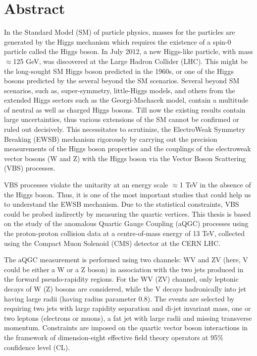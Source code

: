 \chapter*{Abstract}  
In the Standard Model (SM) of particle physics, masses for the particles are generated by the Higgs mechanism which requires the existence of a spin-0 particle called the Higgs boson. In July 2012, a new Higgs-like particle, with mass $\approx$125 GeV, was discovered at the Large Hadron Collider (LHC). This might be the long-sought SM Higgs boson predicted in the 1960s, or one of the Higgs bosons predicted by the several beyond the SM scenarios. Several beyond SM scenarios, such as, super-symmetry, little-Higgs models, and others from the extended Higgs sectors such as the Georgi-Machacek model, contain a multitude of neutral as well as charged Higgs bosons. Till now the existing results contain large uncertainties, thus various extensions of the SM cannot be confirmed or ruled out decisively.
This necessitates to scrutinize, the ElectroWeak Symmetry Breaking (EWSB) mechanism rigorously by carrying out the precision measurements of the Higgs boson properties and the couplings of the electroweak vector bosons (W and Z) with the Higgs boson via the Vector Boson Scattering (VBS) processes.

VBS processes violate the unitarity at an energy scale $\approx$1 TeV in the absence of the Higgs boson. Thus, it is one of the most important studies that could help us to understand the EWSB mechanism. Due to the statistical constraints, VBS could be probed indirectly by measuring the quartic vertices. This thesis is based on the study of the anomalous Quartic Gauge Coupling (aQGC) processes using the proton-proton collision data at a centre-of-mass energy of 13 TeV, collected using the Compact Muon Solenoid (CMS) detector at the CERN LHC.

The aQGC measurement is performed using two channels: WV and ZV (here, V could be either a W or a Z boson) in association with the two jets produced in the forward pseudo-rapidity regions. For the WV (ZV) channel, only leptonic decays of W (Z) bosons are considered, while the V decays hadronically into jet having large radii (having radius parameter 0.8). The events are selected by requiring two jets with large rapidity separation and di-jet invariant mass, one or two leptons (electrons or muons), a fat jet with large radii and missing transverse momentum. Constraints are imposed on the quartic vector boson interactions in the framework of dimension-eight effective field theory operators at 95\% confidence level (CL).

